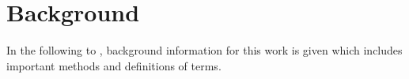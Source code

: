\chapter{Background}
\label{ch:background}
%
In the following  to , background information for this work is given which includes important methods and definitions of terms.
%

%

%

%

%

%
